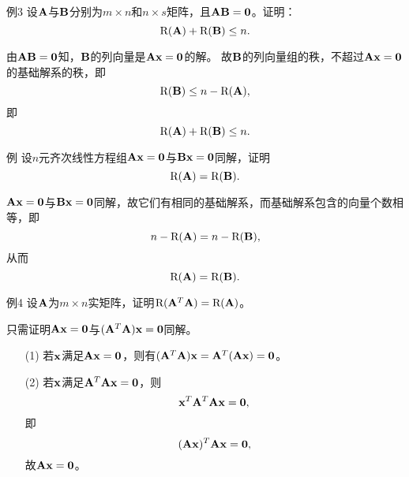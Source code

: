 \begin{frame}
  \begin{footnotesize}
    \begin{exampleblock}{例3}
      设$\mathbf{A}$与$\mathbf{B}$分别为$m\times n$和$n\times s$矩阵，且$\mathbf{A}\mathbf{B}=\mathbf{0}$。证明：
      $$
      \mathrm{R}(\mathbf{A})+\mathrm{R}(\mathbf{B})\le n.
      $$
    \end{exampleblock}
    \pause
    \proofname
    由$\mathbf{A}\mathbf{B}=\mathbf{0}$知，$\mathbf{B}$的列向量是$\mathbf{A}\mathbf{x}=\mathbf{0}$的解。\pause
    故$\mathbf{B}$的列向量组的秩，不超过$\mathbf{A}\mathbf{x}=\mathbf{0}$的基础解系的秩，即
    $$
    \mathrm{R}(\mathbf{B}) \le n-\mathrm{R}(\mathbf{A}),
    $$
    即
    $$
    \mathrm{R}(\mathbf{A})+\mathrm{R}(\mathbf{B})\le n.
    $$
  \end{footnotesize}
\end{frame}

\begin{frame}
  \begin{footnotesize}
    \begin{exampleblock}{例}
      设$n$元齐次线性方程组$\mathbf{A}\mathbf{x}=\mathbf{0}$与$\mathbf{B}\mathbf{x}=\mathbf{0}$同解，证明
      $$
      \mathrm{R}(\mathbf{A})=\mathrm{R}(\mathbf{B}).
      $$
    \end{exampleblock}
    \pause
    \jiename
    $\mathbf{A}\mathbf{x}=\mathbf{0}$与$\mathbf{B}\mathbf{x}=\mathbf{0}$同解，故它们有相同的基础解系，而基础解系包含的向量个数相等，即
    $$
    n-\mathrm{R}(\mathbf{A})=n-\mathrm{R}(\mathbf{B}),
    $$
    从而
    $$
    \mathrm{R}(\mathbf{A})=\mathrm{R}(\mathbf{B}).
    $$
  \end{footnotesize}
\end{frame}

\begin{frame}
  \begin{footnotesize}
    \begin{exampleblock}{例4}
      设$\mathbf{A}$为$m\times n$实矩阵，证明$\mathrm{R}(\mathbf{A}^T\mathbf{A})=\mathrm{R}(\mathbf{A})$。    
    \end{exampleblock}
    \pause
    \jiename
    只需证明$\mathbf{A}\mathbf{x}=\mathbf{0}$与$(\mathbf{A}^T\mathbf{A})\mathbf{x}=\mathbf{0}$同解。
    \pause \vspace{0.1in}

    \begin{itemize}
    \item[(1)] 若$\mathbf{x}$满足$\mathbf{A}\mathbf{x}=\mathbf{0}$，则有$(\mathbf{A}^T\mathbf{A})\mathbf{x}=\mathbf{A}^T(\mathbf{A}\mathbf{x})=\mathbf{0}$。\pause 
    \item[(2)] 若$\mathbf{x}$满足$\mathbf{A}^T\mathbf{A}\mathbf{x}=\mathbf{0}$，则
      $$
      \mathbf{x}^T\mathbf{A}^T\mathbf{A}\mathbf{x}=\mathbf{0},
      $$
      即
      $$
      (\mathbf{A}\mathbf{x})^T\mathbf{A}\mathbf{x}=\mathbf{0},
      $$
      故$\mathbf{A}\mathbf{x}=\mathbf{0}$。
    \end{itemize}
    
  \end{footnotesize}
\end{frame}


